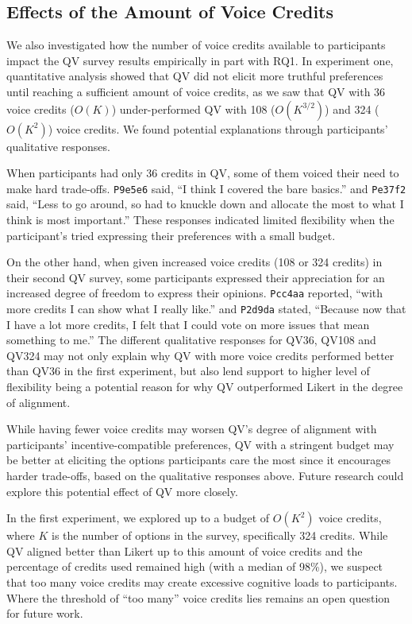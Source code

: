 \subsection{Effects of the Amount of Voice Credits}
We also investigated how the number of voice credits available to participants impact the QV survey results empirically in part with RQ1. In experiment one, quantitative analysis showed that QV did not elicit more truthful preferences until reaching a sufficient amount of voice credits, as we saw that QV with 36 voice credits ($O(K)$) under-performed QV with 108 ($O(K^{3/2})$) and 324 ($O(K^{2})$) voice credits. We found potential explanations through participants' qualitative responses. 

When participants had only 36 credits in QV, some of them voiced their need to make hard trade-offs. \texttt{P9e5e6} said, ``I think I covered the bare basics.'' and \texttt{Pe37f2} said, ``Less to go around, so had to knuckle down and allocate the most to what I think is most important.'' These responses indicated limited flexibility when the participant's tried expressing their preferences with a small budget.

On the other hand, when given increased voice credits (108 or 324 credits) in their second QV survey, some participants expressed their appreciation for an increased degree of freedom to express their opinions. \texttt{Pcc4aa} reported, ``with more credits I can show what I really like.'' and \texttt{P2d9da} stated, ``Because now that I have a lot more credits, I felt that I could vote on more issues that mean something to me.'' The different qualitative responses for QV36, QV108 and QV324 may not only explain why QV with more voice credits performed better than QV36 in the first experiment, but also lend support to higher level of flexibility being a potential reason for why QV outperformed Likert in the degree of alignment. 

While having fewer voice credits may worsen QV's degree of alignment with participants' incentive-compatible preferences, QV with a stringent budget may be better at eliciting the options participants care the most since it encourages harder trade-offs, based on the qualitative responses above. Future research could explore this potential effect of QV more closely.

In the first experiment, we explored up to a budget of $O(K^{2})$ voice credits, where $K$ is the number of options in the survey, specifically 324 credits. While QV aligned better than Likert up to this amount of voice credits and the percentage of credits used remained high (with a median of 98\%), we suspect that too many voice credits may create excessive cognitive loads to participants. Where the threshold of ``too many'' voice credits lies remains an open question for future work.


